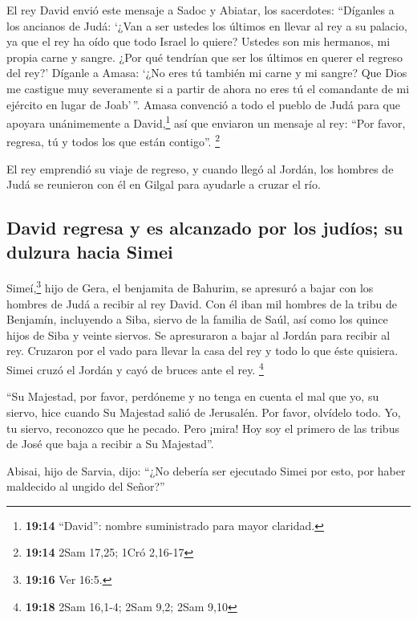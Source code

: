  El rey David envió este mensaje a Sadoc y Abiatar, los
sacerdotes: ``Díganles a los ancianos de Judá: `¿Van a ser ustedes los
últimos en llevar al rey a su palacio, ya que el rey ha oído que todo
Israel lo quiere?  Ustedes son mis hermanos, mi propia
carne y sangre. ¿Por qué tendrían que ser los últimos en querer el
regreso del rey?'  Díganle a Amasa: `¿No eres tú también
mi carne y mi sangre? Que Dios me castigue muy severamente si a partir
de ahora no eres tú el comandante de mi ejército en lugar de Joab'\,''.
 Amasa convenció a todo el pueblo de Judá para que
apoyara unánimemente a David,\footnote{\textbf{19:14} ``David'': nombre
  suministrado para mayor claridad.} así que enviaron un mensaje al rey:
``Por favor, regresa, tú y todos los que están contigo''. \footnote{\textbf{19:14}
  2Sam 17,25; 1Cró 2,16-17}

 El rey emprendió su viaje de regreso, y cuando llegó al
Jordán, los hombres de Judá se reunieron con él en Gilgal para ayudarle
a cruzar el río.

\hypertarget{david-regresa-y-es-alcanzado-por-los-juduxedos-su-dulzura-hacia-simei}{%
\subsection{David regresa y es alcanzado por los judíos; su dulzura
hacia
Simei}\label{david-regresa-y-es-alcanzado-por-los-juduxedos-su-dulzura-hacia-simei}}

 Simeí,\footnote{\textbf{19:16} Ver 16:5.} hijo de Gera,
el benjamita de Bahurim, se apresuró a bajar con los hombres de Judá a
recibir al rey David.  Con él iban mil hombres de la
tribu de Benjamín, incluyendo a Siba, siervo de la familia de Saúl, así
como los quince hijos de Siba y veinte siervos. Se apresuraron a bajar
al Jordán para recibir al rey.  Cruzaron por el vado para
llevar la casa del rey y todo lo que éste quisiera. Simei cruzó el
Jordán y cayó de bruces ante el rey. \footnote{\textbf{19:18} 2Sam
  16,1-4; 2Sam 9,2; 2Sam 9,10}

 ``Su Majestad, por favor, perdóneme y no tenga en cuenta
el mal que yo, su siervo, hice cuando Su Majestad salió de Jerusalén.
Por favor, olvídelo todo.  Yo, tu siervo, reconozco que
he pecado. Pero ¡mira! Hoy soy el primero de las tribus de José que baja
a recibir a Su Majestad''.

 Abisai, hijo de Sarvia, dijo: ``¿No debería ser
ejecutado Simei por esto, por haber maldecido al ungido del Señor?''

